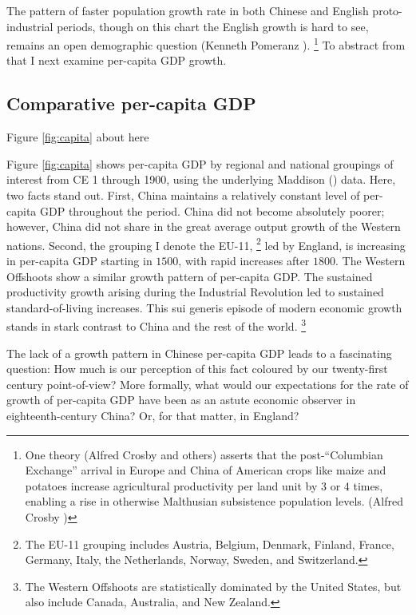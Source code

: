 \documentclass[12pt]{article}
\numberwithin{equation}{section}
\begin{document}
		The pattern of faster population growth rate in both Chinese and English proto-industrial periods, though on this chart the English growth is hard to see, remains an open demographic question (Kenneth Pomeranz \citeyear[p.~22]{pomeranz_great_2001}).  \footnote{One theory (Alfred Crosby and others) asserts that the post-``Columbian Exchange'' arrival in Europe and China of American crops like maize and potatoes increase agricultural productivity per land unit by 3 or 4 times, enabling a rise in otherwise Malthusian subsistence population levels.  (Alfred Crosby \citeyear{crosby_columbian_1972})} To abstract from that I next examine per-capita GDP growth.
		
		\subsection*{Comparative per-capita GDP}			

\begin{center}		
Figure \ref{fig:capita} about here		
\end{center}

		Figure \ref{fig:capita} shows per-capita GDP by regional and national groupings of interest from CE 1 through 1900, using the underlying Maddison (\citeyear{maddison_maddison_2010}) data. Here, two facts stand out. First, China maintains a relatively constant level of per-capita GDP throughout the period. China did not become absolutely poorer; however, China did not share in the great average output growth of the Western nations. Second, the grouping I denote the EU-11, \footnote{The EU-11 grouping includes Austria, Belgium, Denmark, Finland, France, Germany, Italy, the Netherlands, Norway, Sweden, and Switzerland.} led by England, is increasing in per-capita GDP starting in $1500$, with rapid increases after $1800$. The Western Offshoots show a similar growth pattern of per-capita GDP. The sustained productivity growth arising during the Industrial Revolution led to sustained standard-of-living increases. This sui generis episode of modern economic growth stands in stark contrast to China and the rest of the world. \footnote{The Western Offshoots are statistically dominated by the United States, but also include Canada, Australia, and New Zealand.}
		
		The lack of a growth pattern in Chinese per-capita GDP leads to a fascinating question: How much is our perception of this fact coloured by our twenty-first century point-of-view? More formally, what would our expectations for the rate of growth of per-capita GDP have been as an astute economic observer in eighteenth-century China? Or, for that matter, in England?
		
\end{document}
